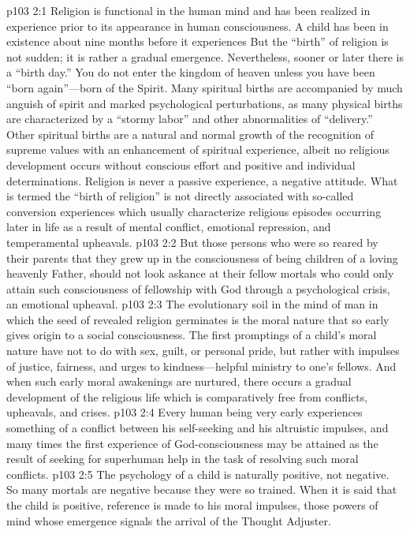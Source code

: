 \vs p103 2:1 Religion is functional in the human mind and has been realized in experience prior to its appearance in human consciousness. A child has been in existence about nine months before it experiences  But the “birth” of religion is not sudden; it is rather a gradual emergence. Nevertheless, sooner or later there is a “birth day.” You do not enter the kingdom of heaven unless you have been “born again”---born of the Spirit. Many spiritual births are accompanied by much anguish of spirit and marked psychological perturbations, as many physical births are characterized by a “stormy labor” and other abnormalities of “delivery.” Other spiritual births are a natural and normal growth of the recognition of supreme values with an enhancement of spiritual experience, albeit no religious development occurs without conscious effort and positive and individual determinations. Religion is never a passive experience, a negative attitude. What is termed the “birth of religion” is not directly associated with so\hyp{}called conversion experiences which usually characterize religious episodes occurring later in life as a result of mental conflict, emotional repression, and temperamental upheavals.
\vs p103 2:2 But those persons who were so reared by their parents that they grew up in the consciousness of being children of a loving heavenly Father, should not look askance at their fellow mortals who could only attain such consciousness of fellowship with God through a psychological crisis, an emotional upheaval.
\vs p103 2:3 The evolutionary soil in the mind of man in which the seed of revealed religion germinates is the moral nature that so early gives origin to a social consciousness. The first promptings of a child’s moral nature have not to do with sex, guilt, or personal pride, but rather with impulses of justice, fairness, and urges to kindness---helpful ministry to one’s fellows. And when such early moral awakenings are nurtured, there occurs a gradual development of the religious life which is comparatively free from conflicts, upheavals, and crises.
\vs p103 2:4 Every human being very early experiences something of a conflict between his self\hyp{}seeking and his altruistic impulses, and many times the first experience of God\hyp{}consciousness may be attained as the result of seeking for superhuman help in the task of resolving such moral conflicts.
\vs p103 2:5 The psychology of a child is naturally positive, not negative. So many mortals are negative because they were so trained. When it is said that the child is positive, reference is made to his moral impulses, those powers of mind whose emergence signals the arrival of the Thought Adjuster.
